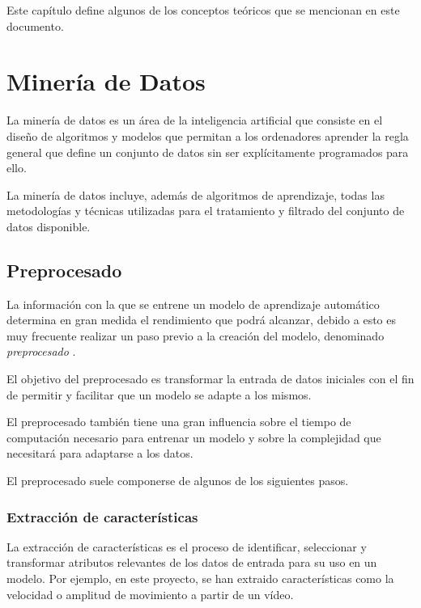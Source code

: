 \label{cha:Conceptos teóricos}

Este capítulo define algunos de los conceptos teóricos que se mencionan en este
documento.

\section{Minería de Datos}

La minería de datos es un área de la inteligencia artificial que consiste en el
diseño de algoritmos y modelos que permitan a los ordenadores aprender la regla
general que define un conjunto de datos sin ser explícitamente programados para
ello.

La minería de datos incluye, además de algoritmos de aprendizaje, todas las
metodologías y técnicas utilizadas para el tratamiento y filtrado del conjunto
de datos disponible.

\subsection{Preprocesado}

La información con la que se entrene un modelo de aprendizaje automático
determina en gran medida el rendimiento que podrá alcanzar, debido a esto es muy
frecuente realizar un paso previo a la creación del modelo, denominado
\textit{preprocesado} \cite{enwiki:1138293751}.

El objetivo del preprocesado es transformar la entrada de datos iniciales con el
fin de permitir y facilitar que un modelo se adapte a los mismos.

El preprocesado también tiene una gran influencia sobre el tiempo de computación
necesario para entrenar un modelo y sobre la complejidad que necesitará para
adaptarse a los datos.

El preprocesado suele componerse de algunos de los siguientes pasos.

\subsubsection{Extracción de características}

La extracción de características es el proceso de identificar, seleccionar y
transformar atributos relevantes de los datos de entrada para su uso en un
modelo. Por ejemplo, en este proyecto, se han extraido características como la
velocidad o amplitud de movimiento a partir de un vídeo.

